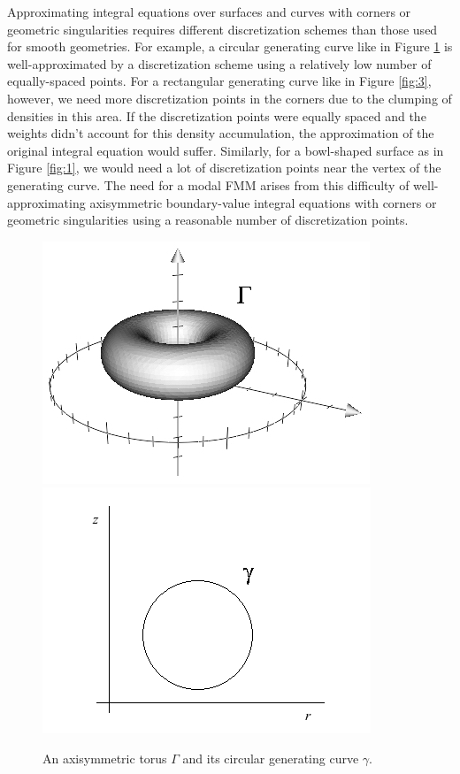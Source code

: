 \documentclass[11pt, oneside]{article}   	%
\begin{document}
Approximating integral equations over surfaces and curves with corners or geometric singularities requires different discretization schemes than those used for smooth geometries. For example, a circular generating curve like in Figure \ref{fig:2} is well-approximated by a discretization scheme using a relatively low number of equally-spaced points. For a rectangular generating curve like in Figure \ref{fig:3}, however, we need more discretization points in the corners due to the clumping of densities in this area. If the discretization points were equally spaced and the weights didn't account for this density accumulation, the approximation of the original integral equation would suffer. Similarly, for a bowl-shaped surface as in Figure \ref{fig:1}, we would need a lot of discretization points near the vertex of the generating curve. The need for a modal FMM arises from this difficulty of well-approximating axisymmetric boundary-value integral equations with corners or geometric singularities using a reasonable number of discretization points.
\begin{figure}[h]
\caption{An axisymmetric torus $\Gamma$ and its circular generating curve $\gamma$.}
\label{fig:2}
\centering
\includegraphics[scale=0.5]{./images/torus}
\includegraphics[scale=0.5]{./images/circle}
\end{figure}
\end{document}
